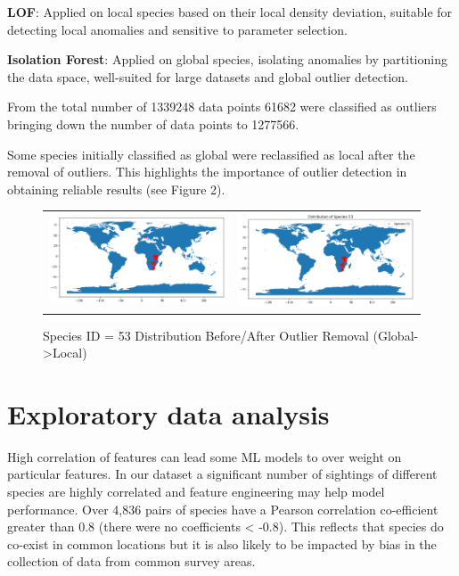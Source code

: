 \documentclass{article}
\begin{document}
\textbf{LOF}: Applied on local species based on their local density deviation,  suitable for detecting local anomalies and sensitive to parameter selection.

\textbf{Isolation Forest}: Applied on global species, isolating anomalies by partitioning the data space, well-suited for large datasets and global outlier detection.

From the total number of 1339248 data points 61682 were classified as outliers bringing down the number of data points to 1277566.

Some species initially classified as global were reclassified as local after the removal of outliers. This highlights the importance of outlier detection in obtaining reliable results (see Figure 2).

\begin{figure}[h]
\centering
\begin{tabular}{ll}
\includegraphics[scale=0.25]{before_outlier_remove.png}&
\includegraphics[scale=0.25]{After_Outlier_Removal.png}\end{tabular}
\caption{Species ID = 53 Distribution Before/After Outlier Removal (Global->Local)}
\label{Fig:Race}
\end{figure}
\section{Exploratory data analysis}
High correlation of features can lead some ML models to over weight on particular features.  In our dataset a significant number of sightings of different species are highly correlated and feature engineering may help model performance.  Over 4,836 pairs of species have a Pearson correlation co-efficient greater than 0.8 (there were no coefficients < -0.8).  This reflects that species do co-exist in common locations but it is also likely to be impacted by bias in the collection of data from common survey areas.  
\end{document}
